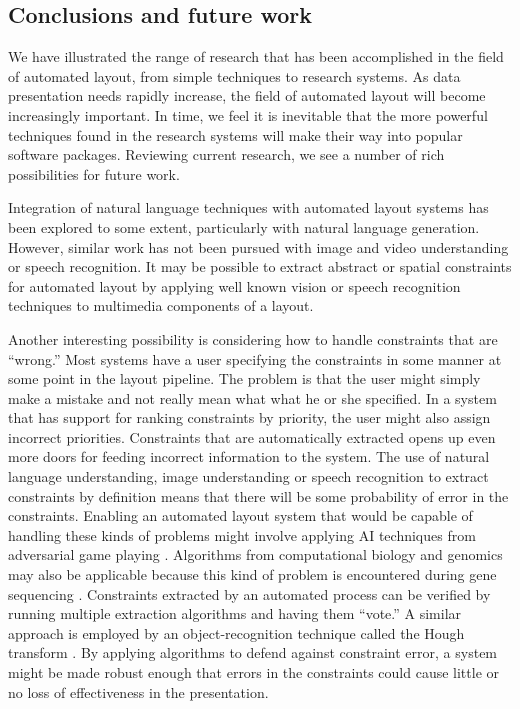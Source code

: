    \subsection{Conclusions and future work}
    \label{conclusions-layout-paper}

    We have illustrated the range of research that has been accomplished in the
    field of automated layout, from simple techniques to research systems. As
    data presentation needs rapidly increase, the field of automated layout
    will become increasingly important. In time, we feel it is inevitable that
    the more powerful techniques found in the research systems will make their
    way into popular software packages. Reviewing current research, we see a
    number of rich possibilities for future work.

    Integration of natural language techniques with automated layout systems
    has been explored to some extent, particularly with natural language
    generation. However, similar work has not been pursued with image and video
    understanding or speech recognition. It may be possible to extract abstract
    or spatial constraints for automated layout by applying well known vision
    or speech recognition techniques to multimedia components of a layout.

    Another interesting possibility is considering how to handle constraints
    that are “wrong.” Most systems have a user specifying the constraints in
    some manner at some point in the layout pipeline. The problem is that the
    user might simply make a mistake and not really mean what what he or she
    specified. In a system that has support for ranking constraints by
    priority, the user might also assign incorrect priorities. Constraints that
    are automatically extracted opens up even more doors for feeding incorrect
    information to the system. The use of natural language understanding, image
    understanding or speech recognition to extract constraints by definition
    means that there will be some probability of error in the constraints.
    Enabling an automated layout system that would be capable of handling these
    kinds of problems might involve applying AI techniques from adversarial
    game playing \citep{nilsson-1}. Algorithms from computational biology and
    genomics may also be applicable because this kind of problem is encountered
    during gene sequencing \citep{salzberg-1}. Constraints extracted by an
    automated process can be verified by running multiple extraction algorithms
    and having them “vote.” A similar approach is employed by an
    object-recognition technique called the Hough transform \citep{horn-1}. By
    applying algorithms to defend against constraint error, a system might be
    made robust enough that errors in the constraints could cause little or no
    loss of effectiveness in the presentation.

